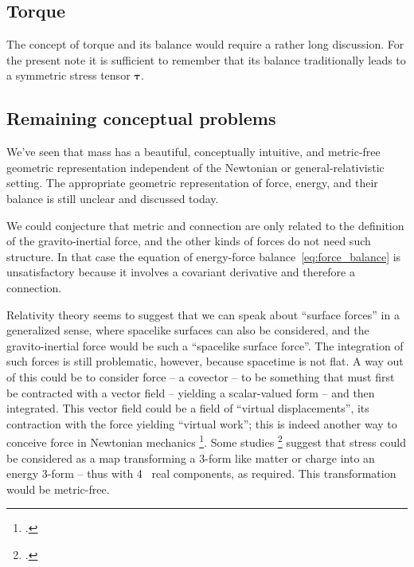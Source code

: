 \documentclass[\ifafour a4paper,12pt,\else a5paper,10pt,\fi%
onecolumn,oneside,article,%
british%
]{memoir}
\theoremstyle{remark}
\theoremstyle{innote}
\newcommand*{\citep}{\footcites}
\newcommand*{\de}{\partialup}%
\renewcommand*{\|}[1][]{\nonscript\,#1\vert\nonscript\;\mathopen{}}
\newcommand*{\sect}{\S}%
\newcommand*{\Li}{\mathrm{L}}
\newcommand*{\yqq}{q}
\newcommand*{\yq}{\bm{\yqq}}
\newcommand*{\yTT}{\tau}
\newcommand*{\yT}{\bm{\yTT}}
\newcommand*{\yvvt}{v}
\newcommand*{\yvt}{\bm{\yvvt}}
\newcommand*{\yFF}{U}
\newcommand*{\yF}{\bm{\yFF}}
\newcommand*{\yFi}{\yF^{\mathord{\star}}}
\newcommand*{\yff}{f}
\newcommand*{\yf}{\bm{\yff}}
\newcommand*{\ye}{\epsilon}
\newcommand*{\ynab}{\nabla}
\begin{document}



\subsection{Torque}

The concept of torque and its balance would require a rather long
discussion. For the present note it is sufficient to remember that its
balance traditionally leads to a symmetric stress tensor $\yT$.


\subsection{Remaining conceptual problems}
\label{sec:conceptual_problems_stress}

We've seen that mass has a beautiful, conceptually intuitive, and
metric-free geometric representation independent of the Newtonian or
general-relativistic setting. The appropriate geometric representation of
force, energy, and their balance is still unclear and discussed today.

We could conjecture that metric and connection are only related to the
definition of the gravito-inertial force, and the other kinds of forces do
not need such structure. In that case the equation of
energy-force balance~\eqref{eq:force_balance} is unsatisfactory because it
involves a covariant derivative and therefore a connection.

Relativity theory seems to suggest that we can speak about \enquote{surface
  forces} in a generalized sense, where spacelike surfaces can also be
considered, and the gravito-inertial force would be such a
\enquote{spacelike surface force}. The integration of such forces is still
problematic, however, because spacetime is not flat. A way out of this
could be to consider force -- a covector -- to be something that must first
be contracted with a vector field -- yielding a scalar-valued form -- and
then integrated. This vector field could be a field of \enquote{virtual
  displacements}, its contraction with the force yielding \enquote{virtual
  work}; this is indeed another way to conceive force in Newtonian
mechanics \citep[\sect~238]{truesdelletal1960}. Some studies
\citep{segev2002,hehletal2003,segev1986,segevetal1999,segev2000,segev2000b}
suggest that stress could be considered as a map transforming a 3-form like
matter or charge into an energy 3-form -- thus with 4~ real
components, as required. This transformation would be metric-free.
\end{document}
